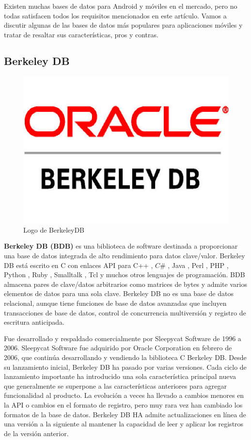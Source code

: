 Existen muchas bases de datos para Android y móviles en el mercado, pero no todas satisfacen todos los requisitos mencionados en este artículo. Vamos a discutir algunas de las bases de datos más populares para aplicaciones móviles y tratar de resaltar sus características, pros y contras.

\subsection{Berkeley DB}\label{chapter:introduction}



\begin{figure}[h!]
\begin{center}
\includegraphics[scale=0.5]{Graphics/images/LogodeBerkeleyDB.jpg}
\caption{Logo de BerkeleyDB}
\label{fig:bdb}

\end{center}
\end{figure}


\textbf{ Berkeley DB (BDB)} es una biblioteca de software destinada a proporcionar una base de datos integrada de alto rendimiento para datos clave/valor. Berkeley DB está escrito en C con enlaces API para C++ , $C\#$ , Java , Perl , PHP , Python , Ruby , Smalltalk , Tcl y muchos otros lenguajes de programación. BDB almacena pares de clave/datos arbitrarios como matrices de bytes y admite varios elementos de datos para una sola clave. Berkeley DB no es una base de datos relacional, aunque tiene funciones de base de datos avanzadas que incluyen transacciones de base de datos, control de concurrencia multiversión y registro de escritura anticipada.

Fue desarrollado y respaldado comercialmente por Sleepycat Software de 1996 a 2006. Sleepycat Software fue adquirido por Oracle Corporation en febrero de 2006, que continúa desarrollando y vendiendo la biblioteca C Berkeley DB. Desde su lanzamiento inicial, Berkeley DB ha pasado por varias versiones. Cada ciclo de lanzamiento importante ha introducido una sola característica principal nueva que generalmente se superpone a las características anteriores para agregar funcionalidad al producto. La evolución a veces ha llevado a cambios menores en la API o cambios en el formato de registro, pero muy rara vez han cambiado los formatos de la base de datos. Berkeley DB HA admite actualizaciones en línea de una versión a la siguiente al mantener la capacidad de leer y aplicar los registros de la versión anterior.

